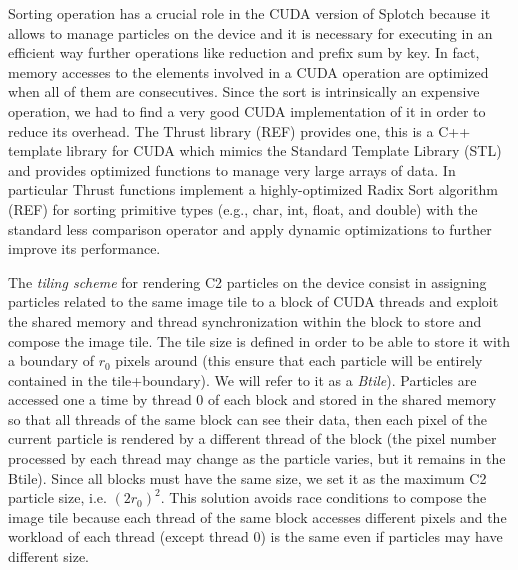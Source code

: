 \documentclass[11pt]{article}
\begin{document}
Sorting operation has a crucial role in the CUDA version of Splotch because it allows to manage particles on the device and it is necessary for executing in an efficient way further operations like reduction and prefix sum by key. In fact, memory accesses to the elements involved in a CUDA operation are optimized when all of them are consecutives. Since the sort is intrinsically an expensive operation, we had to find a very good CUDA implementation of it in order to reduce its overhead. 
The Thrust library (REF) provides one, this is a C++ template library for CUDA which mimics the Standard Template Library (STL) and provides optimized functions to manage very large arrays of data. In particular Thrust functions implement a highly-optimized Radix Sort algorithm (REF) for sorting primitive types (e.g., char, int, float, and double) with the standard less comparison operator and apply dynamic optimizations to further improve its performance.

The \textit{tiling scheme} for rendering C2 particles on the device consist in assigning particles related to the same image tile to a block of CUDA threads and exploit the shared memory and thread synchronization within the block to store and compose the image tile. The tile size is defined in order to be able to store it with a boundary of $r_0$ pixels around (this ensure that each particle will be entirely contained in the tile+boundary). We will refer to it as a \textit{Btile}). Particles are accessed one a time by thread 0 of each block and stored in the shared memory so that all threads of the same block can see their data, then each pixel of the current particle is rendered by a different thread of the block (the pixel number processed by each thread may change as the particle varies, but it remains in the Btile). Since all blocks must have the same size, we set it as the maximum C2 particle size, i.e. $(2r_0)^2$. 
This solution avoids race conditions to compose the image tile because each thread of the same block accesses different pixels and the workload of each thread (except thread 0) is the same even if particles may have different size.
\end{document}
